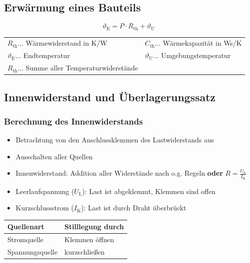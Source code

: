 	\subsection{Erwärmung eines Bauteils}
		\[
			\vartheta_{\mathrm{E}}=P\cdot R_{\mathrm{th}}+\vartheta_{\mathrm{U}}
		\]

		\begin{table}[h]
		\begin{tabular}{ll}
		$R_{\mathrm{th}}\dots$ Wärmewiderstand in K/W & $C_{\mathrm{th}}\dots$ Wärmekapazität in Ws/K\\
		$\vartheta_{\mathrm{E}}\dots$ Endtemperatur & $\vartheta_{\mathrm{U}}\dots$ Umgebungstemperatur\\
		$R_{\mathrm{th}}\dots$ Summe aller Temperaturwiderstände\\
		\end{tabular}
		\end{table}

	\subsection{Innenwiderstand und Überlagerungssatz}
		\subsubsection{Berechnung des Innenwiderstands}
			\begin{itemize}
				\item Betrachtung von den Anschlussklemmen des Lastwiderstands aus
				\item Ausschalten aller Quellen
				\item Innenwiderstand: Addition aller Widerstände nach o.g. Regeln \textbf{oder} $R=\frac{U_{\mathrm{L}}}{I_{\mathrm{K}}}$
				\item Leerlaufspannung ($U_{\mathrm{L}}$): Last ist abgeklemmt, Klemmen sind offen
				\item Kurzschlussstrom ($I_{\mathrm{K}}$): Last ist durch Draht überbrückt
			\end{itemize}
			\begin{table}[here]
			\begin{tabular}{ll}
			Quellenart & Stilllegung durch\\
			\toprule
			Stromquelle & Klemmen öffnen\\
			\midrule
			Spannungsquelle & kurzschließen\\
			\end{tabular}
			\end{table}

